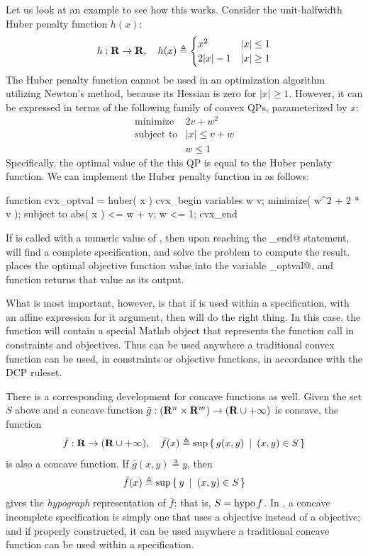 \documentclass[12pt]{article}
\begin{document}
Let us look at an example to see how this works.
Consider the unit-halfwidth Huber penalty function $h(x)$:
\begin{equation}
	h:\R\rightarrow\R, \quad h(x) \eqbydef \Cases{ x^2 & |x| \leq 1 \\ 2|x|-1 & |x| \geq 1 }
\end{equation}
The Huber penalty function cannot be used in an optimization algorithm
utilizing Newton's method,
because its Hessian is zero for $|x|\geq 1$. However,
it can be expressed in terms of the following family of convex QPs,
parameterized by $x$:
\begin{equation}
	\begin{array}{ll}
		\text{minimize}   & 2 v + w^2 \\
		\text{subject to} & | x | \leq v + w \\
		                  & w \leq 1
	\end{array}
\end{equation}
Specifically, the optimal value of the this QP is equal to the Huber
penlaty function.
We can implement the Huber penalty function in \cvx as follows:
\begin{code}
	function cvx_optval = huber( x )
	cvx_begin
	    variables w v;
	    minimize( w^2 + 2 * v );
	    subject to
	        abs( x ) <= w + v;
	        w <= 1;
	cvx_end
\end{code}
If \verb@huber@ is called with a numeric value of \verb@x@, then
upon reaching the \verb@cvx_end@ statement, \cvx will find a complete
specification, and solve the problem to compute the result.
\cvx places the optimal objective function value
into the variable \verb@cvx_optval@, and
function returns that value as its output.

What is most important, however, is that if \verb@huber@
is used within a \cvx specification, with an affine \cvx expression
for it argument, then \cvx will do the right thing.
In this case, the function \verb@huber@ will contain a special Matlab object that
represents the function call in constraints and objectives.
Thus \verb@huber@ can be used anywhere a traditional convex
function can be used, in constraints or objective functions,
in accordance with the DCP ruleset.

There is a corresponding development for concave functions as well.
Given the set
$S$ above and a concave function
$\bar{g}:(\R^n\times\R^m)\rightarrow(\R\cup+\infty)$ is
concave, the function
\begin{equation}
	\label{eq:partial2}
	\bar{f}:\R\rightarrow(\R\cup+\infty), \quad \bar{f}(x) \triangleq \sup\Condset{g(x,y)}{(x,y)\in S }
\end{equation}
is also a concave function.
If $\bar{g}(x,y)\triangleq y$, then
\begin{equation}
	\bar{f}(x) \triangleq \sup\left\{\,y\,~|~\,(x,y)\in S\,\right\}
\end{equation}
gives the \emph{hypograph} representation of $\bar{f}$; that is, $S=\operatorname{hypo} f$.
In \cvx, a concave incomplete specification is simply one that
uses a \verb@maximize@ objective instead of a \verb@minimize@ objective;
and if properly constructed, it can be used anywhere a traditional
concave function can be used within a \cvx specification. 
\end{document}
